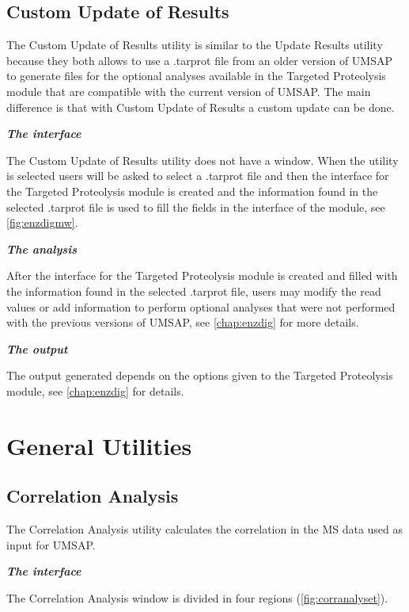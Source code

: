 \subsection{Custom Update of Results }
\label{subsec:reanalyzetarprot}

The Custom Update of Results utility is similar to the Update Results utility because they both allows to use  a .tarprot file from an older version of UMSAP to generate files for the optional analyses available in the Targeted Proteolysis module that are compatible with the current version of UMSAP. The main difference is that with Custom Update of Results a custom update can be done.

\textit{\textbf{The interface}}

The Custom Update of Results utility does not have a window. When the utility is selected users will be asked to select a .tarprot file and then the interface for the Targeted Proteolysis module is created and the information found in the selected .tarprot file is used to fill the fields in the interface of the module, see \autoref{fig:enzdigmw}.

\textit{\textbf{The analysis}}

After the interface for the Targeted Proteolysis module is created and filled with the information found in the selected .tarprot file, users may modify the read values or add information to perform optional analyses that were not performed with the previous versions of UMSAP, see \autoref{chap:enzdig} for more details.

\textit{\textbf{The output}}    

The output generated depends on the options given to the Targeted Proteolysis module, see \autoref{chap:enzdig} for details.

\section{General Utilities}

\subsection{Correlation Analysis}

The Correlation Analysis utility calculates the correlation in the MS data used as input for UMSAP.

\textit{\textbf{The interface}}

The Correlation Analysis window is divided in four regions (\autoref{fig:corranalyset}). 


